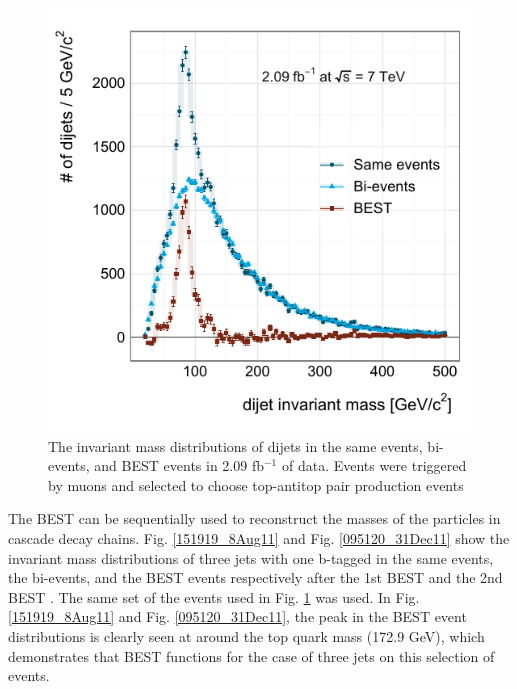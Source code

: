 \begin{figure}[!h]
 \begin{center}
  \includegraphics[scale=1.]{figs/best/c110506_s0102_g001_01}
 \caption{The
invariant mass distributions of dijets in the same events, bi-events,
and BEST events in 2.09 fb${}^{-1}$ of data. Events were
triggered by muons and selected to choose top-antitop pair production
events} \label{153631_13Aug11}
 \end{center}
\end{figure}

The BEST can be sequentially used to reconstruct the masses of the
particles in cascade decay chains. Fig. \ref{151919_8Aug11} and Fig.
\ref{095120_31Dec11} show the invariant mass distributions of three jets
with one b-tagged in the same events, the bi-events, and the BEST events
respectively after the 1st BEST and the 2nd BEST \cite{CMS-AN-2011-396}.
The same set of the events used in Fig. \ref{153631_13Aug11} was used.
In Fig. \ref{151919_8Aug11} and Fig. \ref{095120_31Dec11}, the peak in
the BEST event distributions is clearly seen at around the top quark
mass (172.9 GeV), which demonstrates that BEST functions for the case of
three jets on this selection of events.

